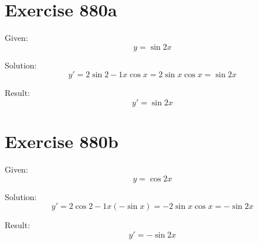 \documentclass[a4paper, 10pt]{scrartcl}
\begin{document}
\section{Exercise 880a}

Given:
\[
y = \sin{2}{x}
\]

Solution:
\[
y' = 2\sin{2 - 1}{x}\cos{x} = 2\sin{x}\cos{x} = \sin{2x}
\]

Result:
\[
y' = \sin{2x}
\]

\section{Exercise 880b}

Given:
\[
y = \cos{2}{x}
\]

Solution:
\[
y' = 2\cos{2 - 1}{x}(-\sin{x}) = -2\sin{x}\cos{x} = -\sin{2x}
\]

Result:
\[
y' = -\sin{2x}
\]
\end{document}
